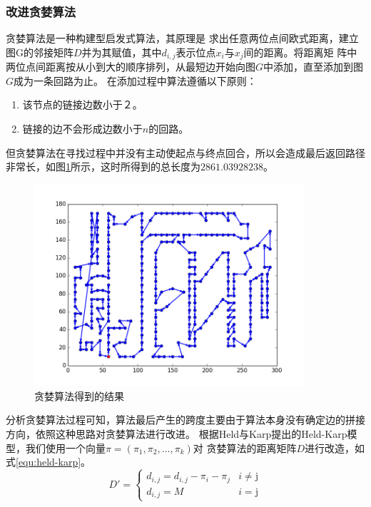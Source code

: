 \documentclass[fontset=windows,a4paper,12pt]{ctexart}
\begin{document}
      \subsubsection{改进贪婪算法\cite{饶卫振2012基于求解}}
        贪婪算法是一种构建型启发式算法，其原理是
        求出任意两位点间欧式距离，建立图G的邻接矩阵$D$并为其赋值，其中$d_{i,j}$表示位点$x_i$与$x_j$间的距离。将距离矩
        阵中两位点间距离按从小到大的顺序排列，从最短边开始向图$G$中添加，直至添加到图$G$成为一条回路为止。
        在添加过程中算法遵循以下原则：
        \begin{enumerate}
        	\item 该节点的链接边数小于２。
        	\item 链接的边不会形成边数小于$n$的回路。
        \end{enumerate}
        
         但贪婪算法在寻找过程中并没有主动使起点与终点回合，所以会造成最后返回路径非常长，如图\ref{fig:fail}所示，这时所得到的总长度为$2861.03928238$。
         \begin{figure}[htbp]
            \centering
            \includegraphics[width=10cm]{pic/greedy_fail.png}
            \caption{贪婪算法得到的结果}
            \label{fig:fail}
        \end{figure}
        
        分析贪婪算法过程可知，算法最后产生的跨度主要由于算法本身没有确定边的拼接方向，依照这种思路对贪婪算法进行改进。
        根据Held与Karp提出的Held-Karp模型\cite{held1970traveling}，我们使用一个向量$\pi=(\pi_1,\pi_2,\dots,\pi_k)$对
        贪婪算法的距离矩阵$D$进行改造，如式\ref{equ:held-karp}。
        \begin{equation}
	        D'=\left\{
		        \begin{array}{ll}
		        	d_{i,j} = d_{i,j} - \pi_i - \pi_j & \textrm{$i \neq $j}\\
		        	d_{i,j} = M & \textrm{$i=$j}
		        \end{array}
	        \right.
	        \label{equ:held-karp}
        \end{equation}
        
\end{document}
